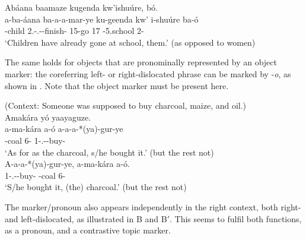 \documentclass[output=paper]{langscibook}
\begin{document}
\ex
\label{bkm:Ref74757932}
Abáana baamaze kugenda kw’ishuúre, bó.\\
\gll
a-ba-áana  ba-a-a-mar-ye  ku-geenda  kw’  i-shuúre  ba-ó\\
-{}child  2.\SM-\N.\PST-\DJ-{}finish-\PFV{}  15-go  17  \AUG-5.school  2-\CM{} \\
\glt
‘Children have already gone at school, them.’ (as opposed to women)\\

\z
\z

The same holds for objects that are pronominally represented by an object marker: the coreferring left- or right-dislocated phrase can be marked by -\textit{o}, as shown in . Note that the object marker must be present here.

\ea
\label{bkm:Ref74758345}
(Context: Someone was supposed to buy charcoal, maize, and oil.)\\
\ea
Amakára yó yaayaguze.\\
\gll
a-ma-kára  a-ó  a-a-a-*(ya)-gur-ye\\
-{}coal  6-\CM{}  1\SM-\N.\PST-\OM{}-buy-\PFV{}\\
\glt
‘As for as the charcoal, s/he bought it.’ (but the rest not)\\

\ex
\gll
A-a-a-*(ya)-gur-ye,  a-ma-kára  a-ó.\\
1\SM-\N.\PST-\OM{}-buy-\PFV{}  -{}coal  6-\CM{}\\
\glt
  ‘S/he bought it, (the) charcoal.’ (but the rest not)\\

\z
\z

The marker/pronoun also appears independently in the right context, both right- and left-dislocated, as illustrated in  B and B$'$. This seems to fulfil both functions, as a pronoun, and a contrastive topic marker.
\end{document}

